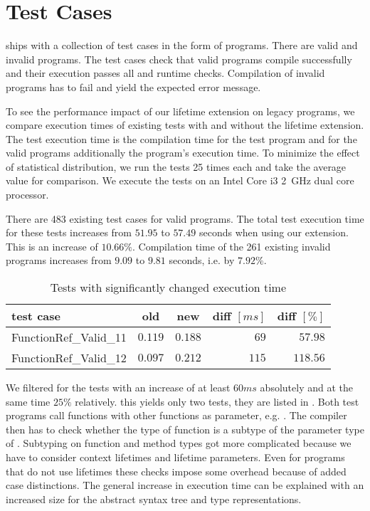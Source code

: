 \section{Test Cases}

\whiley ships with a collection of test cases in the form of programs.
There are valid and invalid programs.
The test cases check that valid programs compile successfully and their execution passes all  and  runtime checks.
Compilation of invalid programs has to fail and yield the expected error message.

To see the performance impact of our lifetime extension on legacy programs, we compare execution times of existing tests with and without the lifetime extension.
The test execution time is the compilation time for the test program and for the valid programs additionally the program's execution time.
To minimize the effect of statistical distribution, we run the tests 25 times each and take the average value for comparison.
We execute the tests on an Intel Core i3 2~GHz dual core processor.

There are 483 existing test cases for valid programs.
The total test execution time for these tests increases from $51.95$ to $57.49$ seconds when using our extension.
This is an increase of $10.66\%$.
Compilation time of the 261 existing invalid programs increases from $9.09$ to $9.81$ seconds, i.e. by $7.92\%$.

\begin{wraptable}{O}{0.65\linewidth}
\footnotesize
\begin{tabular}{ l | c | c | r | r}
test case              & old     & new     & diff $[ms]$ & diff $[\%]$ \\
\hline
FunctionRef\_Valid\_11 & $0.119$ & $0.188$ &  $69$ &  $57.98$ \\
FunctionRef\_Valid\_12 & $0.097$ & $0.212$ & $115$ & $118.56$
\end{tabular}
\caption{Tests with significantly changed execution time}
\label{table:execution-time-significant-change}
\end{wraptable}

We filtered for the tests with an increase of at least  $60ms$ absolutely and at the same time $25\%$ relatively.
this yields only two tests, they are listed in .
Both test programs call functions with other functions as parameter, e.g. .
The compiler then has to check whether the type of function  is a subtype of the parameter type of .
Subtyping on function and method types got more complicated because we have to consider context lifetimes and lifetime parameters.
Even for programs that do not use lifetimes these checks impose some overhead because of added case distinctions.
The general increase in execution time can be explained with an increased size for the abstract syntax tree and type representations.

